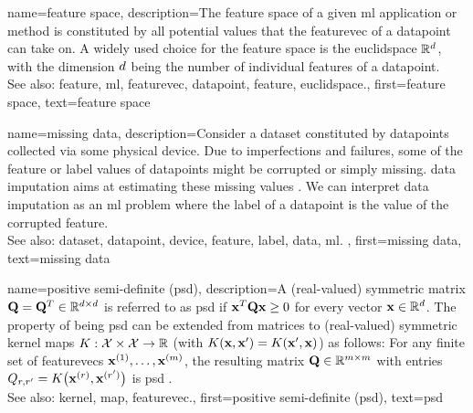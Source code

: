{name={feature space},
	description={The \gls{feature} space of a given \gls{ml} application or method is 
		constituted by all potential values that the \gls{featurevec} of a \gls{datapoint} can 
		take on. A widely used choice for the \gls{feature} space is the \gls{euclidspace} $\mathbb{R}^{d}$, 
		with the dimension $d$ being the number of individual \glspl{feature} of a \gls{datapoint}.
				\\
		See also: \gls{feature}, \gls{ml}, \gls{featurevec}, \gls{datapoint}, \gls{feature}, \gls{euclidspace}.},
	first={feature space},
	text={feature space}  
}


{name={missing data},
	description={Consider a \gls{dataset} constituted by \glspl{datapoint} collected via 
		some physical \gls{device}. Due to imperfections and failures, some of the \gls{feature} 
		or \gls{label} values of \glspl{datapoint} might be corrupted or simply missing. 
		\Gls{data} imputation aims at estimating these missing values \cite{Abayomi2008DiagnosticsFM}. 
		We can interpret \gls{data} imputation as an \gls{ml} problem where the \gls{label} of a \gls{datapoint} is 
		the value of the corrupted \gls{feature}.
				\\
		See also: \gls{dataset}, \gls{datapoint}, \gls{device}, \gls{feature}, \gls{label}, \gls{data}, \gls{ml}. },
	first={missing data},
	text={missing data}  
}


{name={positive semi-definite (psd)},
	description={A (real-valued) symmetric matrix $\mathbf{Q} = \mathbf{Q}^{T} \in \mathbb{R}^{d \times d}$ 
	 	is referred to as psd if ${\bf x}^{T} \mathbf{Q} {\bf x} \geq 0$ for every vector ${\bf x} \in \mathbb{R}^{d}$. 
	 	The property of being psd can be extended from matrices to (real-valued) 
	 	symmetric \gls{kernel} \glspl{map} $K: \mathcal{X} \times \mathcal{X} \rightarrow \mathbb{R}$ 
	 	(with $K({\bf x},{\bf x}') = K({\bf x}',{\bf x})$)
	 	as follows: For any finite set of \glspl{featurevec} ${\bf x}^{(1)}, \ldots, {\bf x}^{(m)}$, 
	 	the resulting matrix $\mathbf{Q} \in \mathbb{R}^{m \times m}$ with 
		entries $Q_{r,r'} = K\big({\bf x}^{(r)},{\bf x}^{(r')}\big)$ 
		is psd \cite{LearningKernelsBook}.
			\\
		See also: \gls{kernel}, \gls{map}, \gls{featurevec}.},
	first={positive semi-definite (psd)},
	text={psd}  
}

